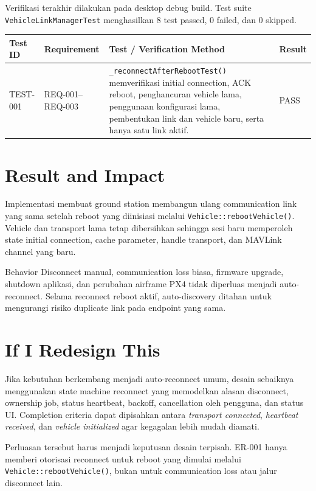 \documentclass[11pt,a4paper]{article}
\begin{document}
Verifikasi terakhir dilakukan pada desktop debug build. Test suite
\texttt{VehicleLinkManagerTest} menghasilkan 8 test passed, 0 failed, dan 0
skipped.

\begin{table}[H]
\centering
\begin{tabularx}{\textwidth}{l l Y l}
\toprule
\textbf{Test ID} &
\textbf{Requirement} &
\textbf{Test / Verification Method} &
\textbf{Result} \\
\midrule
TEST-001 &
REQ-001--REQ-003 &
\nolinkurl{_reconnectAfterRebootTest()} memverifikasi initial connection, ACK reboot,
penghancuran vehicle lama, penggunaan konfigurasi lama, pembentukan link dan vehicle
baru, serta hanya satu link aktif. &
PASS \\
\bottomrule
\end{tabularx}
\end{table}

\section{Result and Impact}

Implementasi membuat ground station membangun ulang communication link yang sama
setelah reboot yang diinisiasi melalui \texttt{Vehicle::rebootVehicle()}. Vehicle
dan transport lama tetap dibersihkan sehingga sesi baru memperoleh state initial
connection, cache parameter, handle transport, dan MAVLink channel yang baru.

Behavior Disconnect manual, communication loss biasa, firmware upgrade, shutdown
aplikasi, dan perubahan airframe PX4 tidak diperluas menjadi auto-reconnect. Selama
reconnect reboot aktif, auto-discovery ditahan untuk mengurangi risiko duplicate
link pada endpoint yang sama.

\section{If I Redesign This}

Jika kebutuhan berkembang menjadi auto-reconnect umum, desain sebaiknya menggunakan
state machine reconnect yang memodelkan alasan disconnect, ownership job, status
heartbeat, backoff, cancellation oleh pengguna, dan status UI. Completion criteria
dapat dipisahkan antara \emph{transport connected}, \emph{heartbeat received}, dan
\emph{vehicle initialized} agar kegagalan lebih mudah diamati.

Perluasan tersebut harus menjadi keputusan desain terpisah. ER-001 hanya memberi
otorisasi reconnect untuk reboot yang dimulai melalui
\texttt{Vehicle::rebootVehicle()}, bukan untuk communication loss atau jalur
disconnect lain.

\end{document}
